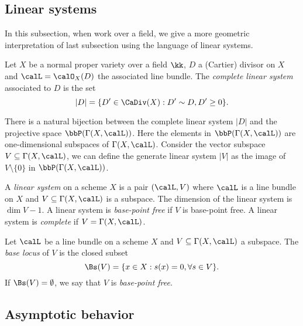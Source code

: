 \subsection{Linear systems}

    In this subsection, when work over a field, we give a more geometric interpretation of last subsection using the language of linear systems.

    \begin{definition}\label{def:geometric_complete_linear_system}
        Let \(X\) be a normal proper variety over a field \(\kk\), \(D\) a (Cartier) divisor on \(X\) and \(\calL=\calO_X(D)\) the associated line bundle.
        The \emph{complete linear system} associated to \(D\) is the set 
        \[ |D| = \{D'\in \CaDiv(X) : D'\sim D, D' \geq 0\}. \]
    \end{definition}

    There is a natural bijection between the complete linear system \(|D|\) and the projective space \(\bbP(\Gamma(X,\calL))\).
    Here the elements in \(\bbP(\Gamma(X,\calL))\) are one-dimensional subspaces of \(\Gamma(X,\calL)\).
    Consider the vector subspace \(V\subseteq \Gamma(X,\calL)\), we can define the generate linear system \(|V|\) as the image of \(V\setminus \{0\}\) in \(\bbP(\Gamma(X,\calL))\).


    \begin{definition}\label{def:general_linear_system}
        A \emph{linear system} on a scheme \(X\) is a pair \((\calL,V)\) where \(\calL\) is a line bundle on \(X\) and \(V\subseteq \Gamma(X,\calL)\) is a subspace.
        The dimension of the linear system is \(\dim V - 1\).
        A linear system is \emph{base-point free} if \(V\) is base-point free.
        A linear system is \emph{complete} if \(V=\Gamma(X,\calL)\).
    \end{definition}

    \begin{definition}\label{def:base_locus}
        Let \(\calL\) be a line bundle on a scheme \(X\) and \(V\subseteq \Gamma(X,\calL)\) a subspace.
        The \emph{base locus} of \(V\) is the closed subset
        \[
            \Bs(V) = \{x\in X : s(x)=0, \forall s\in V\}.
        \]
        If \(\Bs(V)=\emptyset\), we say that \(V\) is \emph{base-point free}.
    \end{definition}


\subsection{Asymptotic behavior}

